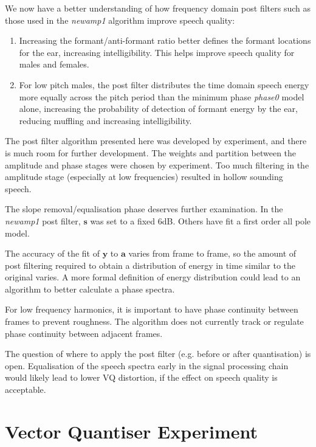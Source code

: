 \documentclass{article}
\begin{document}
We now have a better understanding of how frequency domain post filters such as those used in the \emph{newamp1} algorithm improve speech quality:
\begin{enumerate}
\item Increasing the formant/anti-formant ratio better defines the formant locations for the ear, increasing intelligibility. This helps improve speech quality for males and females.
\item For low pitch males, the post filter distributes the time domain speech energy more equally across the pitch period than the minimum phase \emph{phase0} model alone, increasing the probability of detection of formant energy by the ear, reducing muffling and increasing intelligibility.
\end{enumerate}

The post filter algorithm presented here was developed by experiment, and there is much room for further development. The weights and partition between the amplitude and phase stages were chosen by experiment. Too much filtering in the amplitude stage (especially at low frequencies) resulted in hollow sounding speech.

The slope removal/equalisation phase deserves further examination.  In the \emph{newamp1} post filter, $\mathbf{s}$ was set to a fixed 6dB.  Others \cite[Section 4.3, p 148]{kleijn1995speech} have fit a first order all pole model.

The accuracy of the fit of $\mathbf{y}$ to $\mathbf{a}$ varies from frame to frame, so the amount of post filtering required to obtain a distribution of energy in time similar to the original varies.  A more formal definition of energy distribution could lead to an algorithm to better calculate a phase spectra.

For low frequency harmonics, it is important to have phase continuity between frames to prevent roughness.  The algorithm does not currently track or regulate phase continuity between adjacent frames.

The question of where to apply the post filter (e.g. before or after quantisation) is open.  Equalisation of the speech spectra early in the signal processing chain would likely lead to lower VQ distortion, if the effect on speech quality is acceptable.

\section{Vector Quantiser Experiment}
\end{document}
